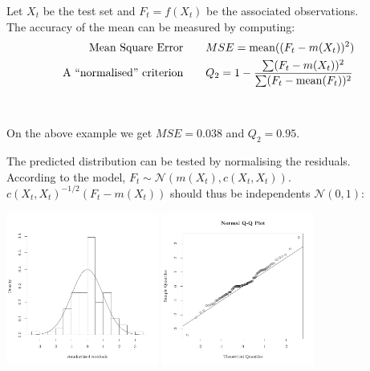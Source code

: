 \begin{frame}{}
Let $X_t$ be the test set and $F_t=f(X_t)$ be the associated observations.\\ \vspace{5mm}
The accuracy of the mean can be measured by computing:
\begin{equation*}
	\begin{split}
		\text{Mean Square Error\qquad}& MSE = \mathrm{mean} ((F_t - m(X_t))^2) \\
		\text{A ``normalised'' criterion\qquad}& Q_2 = 1 - \frac{\sum (F_t - m(X_t))^2}{\sum (F_t - \mathrm{mean}(F_t))^2}
	\end{split}
\end{equation*}
\\ \ \\
On the above example we get $MSE = 0.038$ and $Q_2 = 0.95$.
\end{frame}

\begin{frame}{}
The predicted distribution can be tested by normalising the residuals. \\ \vspace{3mm}
According to the model, $F_t \sim \mathcal{N}(m(X_t),c(X_t,X_t))$.\\ \vspace{3mm}
$c(X_t,X_t)^{-1/2}(F_t-m(X_t)) $ should thus be independents $\mathcal{N}(0,1)$:
\begin{center}
\includegraphics[height=5cm]{3_gaussian_process_regression/figures/R/VALID_hist} \qquad
\includegraphics[height=5cm]{3_gaussian_process_regression/figures/R/VALID_qqplot}
\end{center}
\end{frame}

